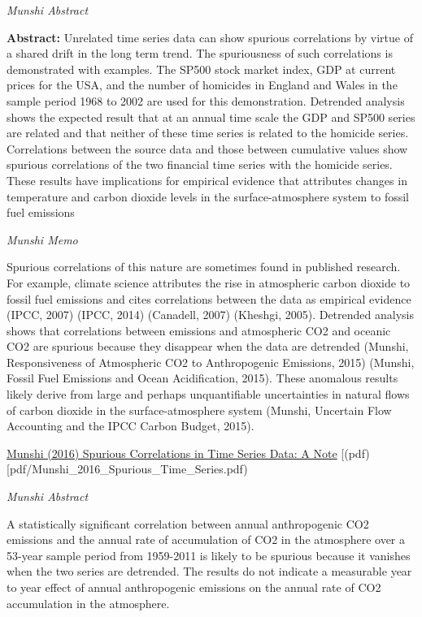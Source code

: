 \documentclass[
]{book}
\begin{document}
\emph{Munshi Abstract}

\textbf{Abstract:} Unrelated time series data can show spurious correlations by virtue of a shared drift in the long term trend. The
spuriousness of such correlations is demonstrated with examples. The SP500 stock market index, GDP at current prices for the
USA, and the number of homicides in England and Wales in the sample period 1968 to 2002 are used for this demonstration.
Detrended analysis shows the expected result that at an annual time scale the GDP and SP500 series are related and that
neither of these time series is related to the homicide series. Correlations between the source data and those between
cumulative values show spurious correlations of the two financial time series with the homicide series.
These results have implications for empirical evidence that attributes changes in temperature and carbon dioxide levels in the surface-atmosphere system to fossil fuel emissions

\emph{Munshi Memo}

Spurious correlations of this nature are sometimes found in published research. For example, climate
science attributes the rise in atmospheric carbon dioxide to fossil fuel emissions and cites correlations
between the data as empirical evidence (IPCC, 2007) (IPCC, 2014) (Canadell, 2007) (Kheshgi, 2005).
Detrended analysis shows that correlations between emissions and atmospheric CO2 and oceanic CO2
are spurious because they disappear when the data are detrended (Munshi, Responsiveness of
Atmospheric CO2 to Anthropogenic Emissions, 2015) (Munshi, Fossil Fuel Emissions and Ocean
Acidification, 2015). These anomalous results likely derive from large and perhaps unquantifiable
uncertainties in natural flows of carbon dioxide in the surface-atmosphere system (Munshi, Uncertain
Flow Accounting and the IPCC Carbon Budget, 2015).

\href{https://www.researchgate.net/publication/306376553_Spurious_Correlations_in_Time_Series_Data_A_Note}{Munshi (2016) Spurious Correlations in Time Series Data: A Note}
{[}(pdf){[}pdf/Munshi\_2016\_Spurious\_Time\_Series.pdf)

\emph{Munshi Abstract}

A statistically significant correlation between annual anthropogenic CO2 emissions and the annual rate of accumulation of CO2 in the atmosphere over a 53-year sample period from 1959-2011 is likely to be spurious because it vanishes when the two series are detrended. The results do not indicate a measurable year to year effect of annual anthropogenic emissions on the annual rate of CO2 accumulation in the atmosphere.
\end{document}
